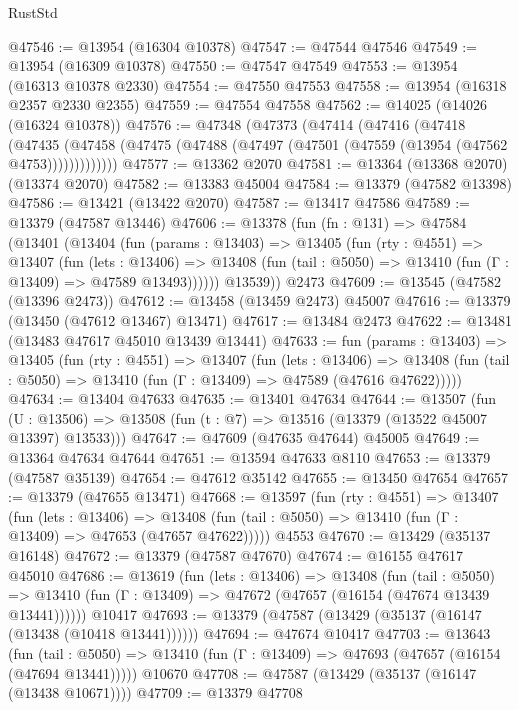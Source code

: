 \begin{lexlean}{RustStd}
\begin{coremodule}
@47546 := @13954 (@16304 @10378)
@47547 := @47544 @47546
@47549 := @13954 (@16309 @10378)
@47550 := @47547 @47549
@47553 := @13954 (@16313 @10378 @2330)
@47554 := @47550 @47553
@47558 := @13954 (@16318 @2357 @2330 @2355)
@47559 := @47554 @47558
@47562 := @14025 (@14026 (@16324 @10378))
@47576 := @47348
    (@47373
      (@47414
        (@47416
          (@47418
            (@47435
              (@47458 (@47475 (@47488 (@47497 (@47501 (@47559 (@13954 (@47562 @4753)))))))))))))
@47577 := @13362 @2070
@47581 := @13364 (@13368 @2070) (@13374 @2070)
@47582 := @13383 @45004
@47584 := @13379 (@47582 @13398)
@47586 := @13421 (@13422 @2070)
@47587 := @13417 @47586
@47589 := @13379 (@47587 @13446)
@47606 := @13378
    (fun (fn : @131) =>
    @47584
      (@13401
        (@13404
          (fun (params : @13403) =>
          @13405
            (fun (rty : @4551) =>
            @13407
              (fun (lets : @13406) =>
              @13408 (fun (tail : @5050) => @13410 (fun (Γ : @13409) => @47589 @13493))))))
        @13539))
    @2473
@47609 := @13545 (@47582 (@13396 @2473))
@47612 := @13458 (@13459 @2473) @45007
@47616 := @13379 (@13450 (@47612 @13467) @13471)
@47617 := @13484 @2473
@47622 := @13481 (@13483 @47617 @45010 @13439 @13441)
@47633 := fun (params : @13403) =>
  @13405
    (fun (rty : @4551) =>
    @13407
      (fun (lets : @13406) =>
      @13408 (fun (tail : @5050) => @13410 (fun (Γ : @13409) => @47589 (@47616 @47622)))))
@47634 := @13404 @47633
@47635 := @13401 @47634
@47644 := @13507
    (fun (U : @13506) => @13508 (fun (t : @7) => @13516 (@13379 (@13522 @45007 @13397) @13533)))
@47647 := @47609 (@47635 @47644) @45005
@47649 := @13364 @47634 @47644
@47651 := @13594 @47633 @8110
@47653 := @13379 (@47587 @35139)
@47654 := @47612 @35142
@47655 := @13450 @47654
@47657 := @13379 (@47655 @13471)
@47668 := @13597
    (fun (rty : @4551) =>
    @13407
      (fun (lets : @13406) =>
      @13408 (fun (tail : @5050) => @13410 (fun (Γ : @13409) => @47653 (@47657 @47622)))))
    @4553
@47670 := @13429 (@35137 @16148)
@47672 := @13379 (@47587 @47670)
@47674 := @16155 @47617 @45010
@47686 := @13619
    (fun (lets : @13406) =>
    @13408
      (fun (tail : @5050) =>
      @13410 (fun (Γ : @13409) => @47672 (@47657 (@16154 (@47674 @13439 @13441))))))
    @10417
@47693 := @13379 (@47587 (@13429 (@35137 (@16147 (@13438 (@10418 @13441))))))
@47694 := @47674 @10417
@47703 := @13643
    (fun (tail : @5050) => @13410 (fun (Γ : @13409) => @47693 (@47657 (@16154 (@47694 @13441)))))
    @10670
@47708 := @47587 (@13429 (@35137 (@16147 (@13438 @10671))))
@47709 := @13379 @47708

\end{coremodule}
\end{lexlean}

